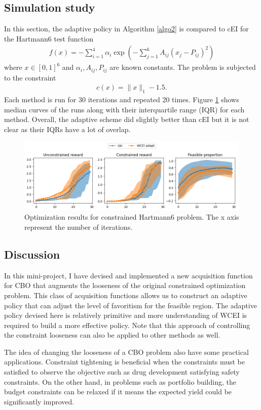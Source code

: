 \subsection{Simulation study}
In this section, the adaptive policy in Algorithm \ref{algo2} is compared to cEI for the Hartmann6 test function
\begin{align}
    f(x) = -\sum_{i=1}^4\alpha_i\exp{\left(-\sum_{j=1}^6A_{ij}(x_j-P_{ij})^2\right)}
\end{align}
where $x\in[0,1]^6$ and $\alpha_i,A_{ij},P_{ij}$ are known constants. The problem is subjected to the constraint
\begin{align}
    c(x) = \|x\|_1-1.5.
\end{align}
Each method is run for 30 iterations and repeated 20 times. Figure \ref{fig_hart} shows median curves of the runs along with their interquartile range (IQR) for each method. Overall, the adaptive scheme did slightly better than cEI but it is not clear as their IQRs have a lot of overlap.
\begin{figure}[h]
    \centering
    \includegraphics[width=\linewidth]{Figures/hartman_res.png}
    \caption{Optimization results for constrained Hartmann6 problem. The x axis represent the number of iterations.}
    \label{fig_hart}
\end{figure}

\subsection{Discussion}
In this mini-project, I have devised and implemented a new acquisition function for CBO that augments the looseness of the original constrained optimization problem. This class of acquisition functions allows us to construct an adaptive policy that can adjust the level of favoritism for the feasible region. The adaptive policy devised here is relatively primitive and more understanding of WCEI is required to build a more effective policy. Note that this approach of controlling the constraint looseness can also be applied to other methods as well.

The idea of changing the looseness of a CBO problem also have some practical applications. Constraint tightening is beneficial when the constraints must be satisfied to observe the objective such as drug development satisfying safety constraints. On the other hand, in problems such as portfolio building, the budget constraints can be relaxed if it means the expected yield could be significantly improved. 
